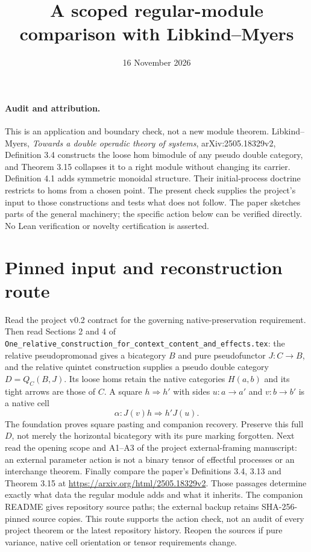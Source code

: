 \documentclass{article}
\title{A scoped regular-module comparison with Libkind--Myers}
\date{16 November 2026}
\begin{document}
\maketitle
\paragraph{Audit and attribution.}
This is an application and boundary check, not a new module theorem. Libkind--Myers, \emph{Towards a double operadic theory of systems}, arXiv:2505.18329v2, Definition 3.4 constructs the loose hom bimodule of any pseudo double category, and Theorem 3.15 collapses it to a right module without changing its carrier. Definition 4.1 adds symmetric monoidal structure. Their initial-process doctrine restricts to homs from a chosen point. The present check supplies the project's input to those constructions and tests what does not follow. The paper sketches parts of the general machinery; the specific action below can be verified directly. No Lean verification or novelty certification is asserted.

\section{Pinned input and reconstruction route}
Read the project v0.2 contract for the governing native-preservation requirement. Then read Sections 2 and 4 of \texttt{One\_relative\_construction\_for\_context\_content\_and\_effects.tex}: the relative pseudopromonad gives a bicategory $B$ and pure pseudofunctor $J:C\to B$, and the relative quintet construction supplies a pseudo double category $D=Q_C(B,J)$. Its loose homs retain the native categories $H(a,b)$ and its tight arrows are those of $C$. A square $h\Rightarrow h'$ with sides $u:a\to a'$ and $v:b\to b'$ is a native cell
\[\alpha:J(v)h\Longrightarrow h'J(u).\]
The foundation proves square pasting and companion recovery. Preserve this full $D$, not merely the horizontal bicategory with its pure marking forgotten. Next read the opening scope and A1--A3 of the project external-framing manuscript: an external parameter action is not a binary tensor of effectful processes or an interchange theorem. Finally compare the paper's Definitions 3.4, 3.13 and Theorem 3.15 at \url{https://arxiv.org/html/2505.18329v2}. Those passages determine exactly what data the regular module adds and what it inherits. The companion README gives repository source paths; the external backup retains SHA-256-pinned source copies. This route supports the action check, not an audit of every project theorem or the latest repository history. Reopen the sources if pure variance, native cell orientation or tensor requirements change.
\end{document}
